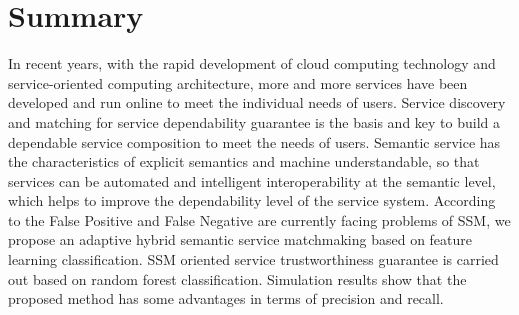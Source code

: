 \documentclass{ieeeaccess}
\begin{document}
\section{Summary}
In recent years, with the rapid development of cloud computing technology and service-oriented computing architecture, more and more services have been developed and run online to meet the individual needs of users. Service discovery and matching for service dependability guarantee is the basis and key to build a dependable service composition to meet the needs of users. Semantic service has the characteristics of explicit semantics and machine understandable, so that services can be automated and intelligent interoperability at the semantic level, which helps to improve the dependability level of the service system. According to the False Positive and False Negative are currently facing problems of SSM, we propose an adaptive hybrid semantic service matchmaking based on feature learning classification. SSM oriented service trustworthiness guarantee is carried out based on random forest classification. Simulation results show that the proposed method has some advantages in terms of precision and recall.
\end{document}
